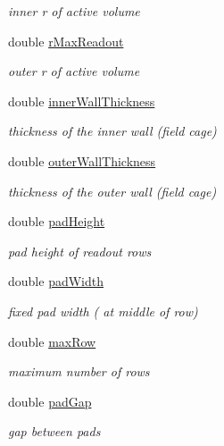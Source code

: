 \begin{DoxyCompactItemize}
\begin{DoxyCompactList}\small\item\em inner r of active volume \end{DoxyCompactList}\item 
double \hyperlink{struct_d_d4hep_1_1_d_d_rec_1_1_fixed_pad_size_t_p_c_struct_adf51c80b073c09ae26ce58fec05324ae}{r\+Max\+Readout}
\begin{DoxyCompactList}\small\item\em outer r of active volume \end{DoxyCompactList}\item 
double \hyperlink{struct_d_d4hep_1_1_d_d_rec_1_1_fixed_pad_size_t_p_c_struct_a3c12241f45c3762bd94ca39febc2f74a}{inner\+Wall\+Thickness}
\begin{DoxyCompactList}\small\item\em thickness of the inner wall (field cage) \end{DoxyCompactList}\item 
double \hyperlink{struct_d_d4hep_1_1_d_d_rec_1_1_fixed_pad_size_t_p_c_struct_aafd297bbbf6703fe145eadc4eeaa38fc}{outer\+Wall\+Thickness}
\begin{DoxyCompactList}\small\item\em thickness of the outer wall (field cage) \end{DoxyCompactList}\item 
double \hyperlink{struct_d_d4hep_1_1_d_d_rec_1_1_fixed_pad_size_t_p_c_struct_ab95a90cdaafbb23696608e1d1ad0df14}{pad\+Height}
\begin{DoxyCompactList}\small\item\em pad height of readout rows \end{DoxyCompactList}\item 
double \hyperlink{struct_d_d4hep_1_1_d_d_rec_1_1_fixed_pad_size_t_p_c_struct_aeac7b4785ec2067ddf6d50b8e19c8ee0}{pad\+Width}
\begin{DoxyCompactList}\small\item\em fixed pad width ( at middle of row) \end{DoxyCompactList}\item 
double \hyperlink{struct_d_d4hep_1_1_d_d_rec_1_1_fixed_pad_size_t_p_c_struct_acb713c655ac777ede8f3c951f4f83a1e}{max\+Row}
\begin{DoxyCompactList}\small\item\em maximum number of rows \end{DoxyCompactList}\item 
double \hyperlink{struct_d_d4hep_1_1_d_d_rec_1_1_fixed_pad_size_t_p_c_struct_a28e26e987689e132b295e84586133520}{pad\+Gap}
\begin{DoxyCompactList}\small\item\em gap between pads \end{DoxyCompactList}\end{DoxyCompactItemize}



